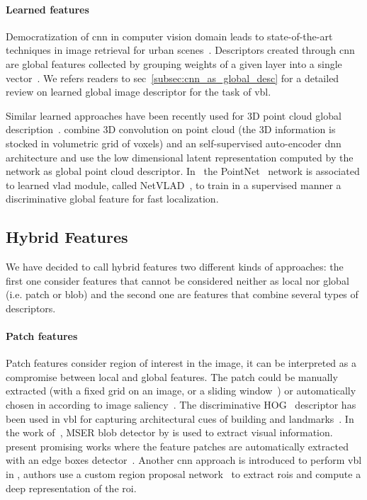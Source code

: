 		\paragraph{Learned features}
			\label{para:global_cnn}
			Democratization of \ac{cnn} in computer vision domain leads to state-of-the-art techniques in image retrieval for urban scenes~\citep{Arandjelovic2017,Gordo2016,Kim2017a,Radenovic2016}. Descriptors created through \ac{cnn} are global features collected by grouping weights of a given layer into a single vector~\citep{Babenko2014}. We refers readers to \acl{sec}~\ref{subsec:cnn_as_global_desc} for a detailed review on learned global image descriptor for the task of \ac{vbl}. 
			
			Similar learned approaches have been recently used for 3D point cloud global description~\citep{Uy2018,Schonberger2017a}. \citet{Schonberger2017a} combine 3D convolution on point cloud (the 3D information is stocked in volumetric grid of voxels) and an self-supervised auto-encoder \ac{dnn} architecture and use the low dimensional latent representation computed by the network as global point cloud descriptor. In~\citep{Uy2018} the PointNet~\citep{Qi2016a} network is associated to learned \ac{vlad} module, called NetVLAD~\citep{Arandjelovic2017}, to train in a supervised manner a discriminative global feature for fast localization.

	\subsection{Hybrid Features}
	\label{subsec:hybrid_feature}
		We have decided to call hybrid features two different kinds of approaches: the first one consider features that cannot be considered neither as local nor global (i.e. patch or blob) and the second one are features that combine several types of descriptors.
		\paragraph{Patch features}
			Patch features consider region of interest in the image, it can be interpreted as a compromise between local and global features. The patch could be manually extracted (with a fixed grid on an image, or a sliding window~\citep{Dalal2005}) or automatically chosen in according to image saliency~\citep{Matas2004}. The discriminative HOG~\citep{Dalal2005} descriptor has been used in \ac{vbl} for capturing architectural cues of building and landmarks~\citep{Shrivastava2011, Aubry2014, McManus2014,Morago2016}. In the work of~\citep{Nister2006,Kim2015}, MSER blob detector by \citet{Matas2004} is used to extract visual information. \citet{Sunderhauf2015a} present promising works where the feature patches are automatically extracted with an edge boxes detector~\citep{Zitnick2014}. Another \ac{cnn} approach is introduced to perform \ac{vbl} in \citep{Gordo2016}, authors use a custom region proposal network~\citep{Ren2015} to extract \acp{roi} and compute a deep representation of the \ac{roi}.
			
